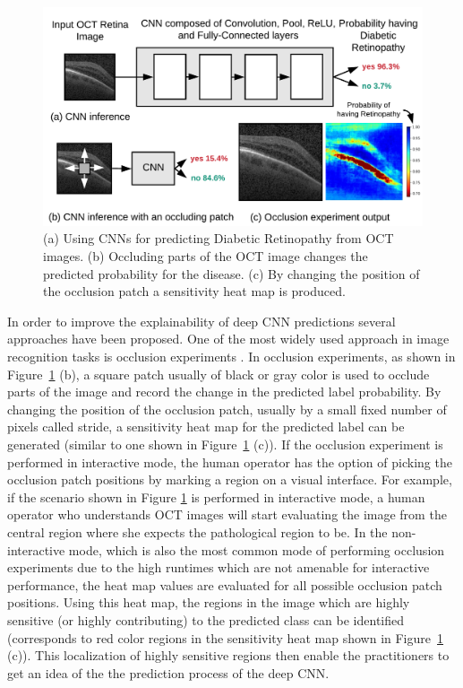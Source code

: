 \begin{figure}[t]
  \includegraphics[width=\columnwidth]{./images/krypton_overview}
  \caption{(a) Using CNNs for predicting Diabetic Retinopathy from OCT images. (b) Occluding parts of the OCT image changes the predicted probability for the disease. (c) By changing the position of the occlusion patch a sensitivity heat map is produced.}
  \label{fig:krypton_overview}
\end{figure}

In order to improve the explainability of deep CNN predictions several approaches have been proposed.
One of the most widely used approach in image recognition tasks is occlusion experiments \cite{zeiler2014visualizing}.
In occlusion experiments, as shown in Figure~\ref{fig:krypton_overview} (b), a square patch usually of black or gray color is used to occlude parts of the image and record the change in the predicted label probability.
By changing the position of the occlusion patch, usually by a small fixed number of pixels called stride, a sensitivity heat map for the predicted label can be generated (similar to one shown in Figure~\ref{fig:krypton_overview} (c)).
If the occlusion experiment is performed in interactive mode, the human operator has the option of picking the occlusion patch positions by marking a region on a visual interface.
For example, if the scenario shown in Figure \ref{fig:krypton_overview} is performed in interactive mode, a human operator who understands OCT images will start evaluating the image from the central region where she expects the pathological region to be.
In the non-interactive mode, which is also the most common mode of performing occlusion experiments due to the high runtimes which are not amenable for interactive performance, the heat map values are evaluated for all possible occlusion patch positions.
Using this heat map, the regions in the image which are highly sensitive (or highly contributing) to the predicted class can be identified (corresponds to red color regions in the sensitivity heat map shown in Figure~\ref{fig:krypton_overview} (c)).
This localization of highly sensitive regions then enable the practitioners to get an idea of the the prediction process of the deep CNN.

